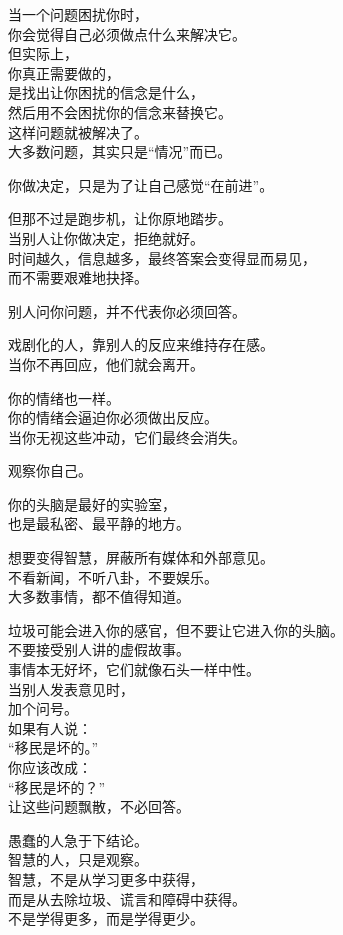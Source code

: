 \documentclass[
]{article}
\begin{document}
当一个问题困扰你时，\\
你会觉得自己必须做点什么来解决它。\\
但实际上，\\
你真正需要做的，\\
是找出让你困扰的信念是什么，\\
然后用不会困扰你的信念来替换它。\\
这样问题就被解决了。\\
大多数问题，其实只是``情况''而已。

你做决定，只是为了让自己感觉``在前进''。

但那不过是跑步机，让你原地踏步。\\
当别人让你做决定，拒绝就好。\\
时间越久，信息越多，最终答案会变得显而易见，\\
而不需要艰难地抉择。

别人问你问题，并不代表你必须回答。

戏剧化的人，靠别人的反应来维持存在感。\\
当你不再回应，他们就会离开。

你的情绪也一样。\\
你的情绪会逼迫你必须做出反应。\\
当你无视这些冲动，它们最终会消失。

观察你自己。

你的头脑是最好的实验室，\\
也是最私密、最平静的地方。

想要变得智慧，屏蔽所有媒体和外部意见。\\
不看新闻，不听八卦，不要娱乐。\\
大多数事情，都不值得知道。

垃圾可能会进入你的感官，但不要让它进入你的头脑。\\
不要接受别人讲的虚假故事。\\
事情本无好坏，它们就像石头一样中性。\\
当别人发表意见时，\\
加个问号。\\
如果有人说：\\
``移民是坏的。''\\
你应该改成：\\
``移民是坏的？''\\
让这些问题飘散，不必回答。

愚蠢的人急于下结论。\\
智慧的人，只是观察。\\
智慧，不是从学习更多中获得，\\
而是从去除垃圾、谎言和障碍中获得。\\
不是学得更多，而是学得更少。
\end{document}
